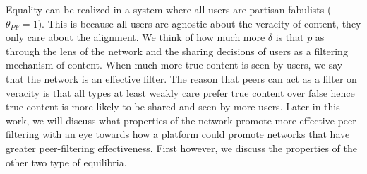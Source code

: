 Equality can be realized in a system where all users are partisan fabulists ($\theta_{PF} = 1$). This is because all users are agnostic about the veracity of content, they only care about the alignment. We think of how much more $\delta$ is that $p$ as through the lens of the network and the sharing decisions of users as a filtering mechanism of content. When much more true content is seen by users, we say that the network is an effective filter. The reason that peers can act as a filter on veracity is that all types at least weakly care prefer true content over false hence true content is more likely to be shared and seen by more users.  Later in this work, we will discuss what properties of the network promote more effective peer filtering with an eye towards how a platform could promote networks that have greater peer-filtering effectiveness. First however, we discuss the properties of the other two type of equilibria. 

